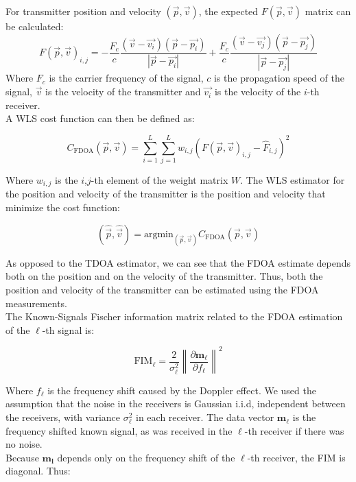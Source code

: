 For transmitter position and velocity $(\vec{p},\vec{v})$, the expected $F(\vec{p},\vec{v})$ matrix can be calculated:
\begin{equation}
F(\vec{p},\vec{v})_{i,j} = -\frac{F_c}{c}\frac{(\vec{v}-\vec{v_i})(\vec{p}-\vec{p_i})}{|\vec{p}-\vec{p_i}|}+\frac{F_c}{c}\frac{(\vec{v}-\vec{v_j})(\vec{p}-\vec{p_j})}{|\vec{p}-\vec{p_j}|}
\end{equation}
Where $F_c$ is the carrier frequency of the signal, $c$ is the propagation speed of the signal, $\vec{v}$ is the velocity of the transmitter and $\vec{v_i}$ is the velocity of the $i$-th receiver.\\

A WLS cost function can then be defined as:

\begin{equation}
C_{\text{FDOA}}(\vec{p},\vec{v}) = \sum_{i=1}^L \sum_{j=1}^L w_{i,j}(F(\vec{p},\vec{v})_{i,j}-\hat{F}_{i,j})^2
\end{equation}

Where $w_{i,j}$ is the $i$,$j$-th element of the weight matrix $W$.
The WLS estimator for the position and velocity of the transmitter is the position and velocity that minimize the cost function:

\begin{equation}
(\hat{\vec{p}},\hat{\vec{v}}) = \text{argmin}_{(\vec{p},\vec{v})}C_{\text{FDOA}}(\vec{p},\vec{v})
\end{equation}

As opposed to the TDOA estimator, we can see that the FDOA estimate depends both on the position and on the velocity of the transmitter. Thus, both the position and velocity of the transmitter can be estimated using the FDOA measurements.\\

The Known-Signals Fischer information matrix related to the FDOA estimation of the $\ell$-th signal is:

\begin{equation}
\text{FIM}_\ell = \frac{2}{\sigma_\ell^2}\left\|\frac{\partial \mathbf{m_\ell}}{\partial f_\ell}\right\|^2
\end{equation}

Where $f_\ell$ is the frequency shift caused by the Doppler effect. We used the assumption that the noise in the receivers is Gaussian i.i.d, independent between the receivers, with variance $\sigma_\ell^2$ in each receiver. The data vector $\mathbf{m_\ell}$ is the frequency shifted known signal, as was received in the $\ell$-th receiver if there was no noise.\\
Because $\mathbf{m_l}$ depends only on the frequency shift of the $\ell$-th receiver, the FIM is diagonal.
Thus:

